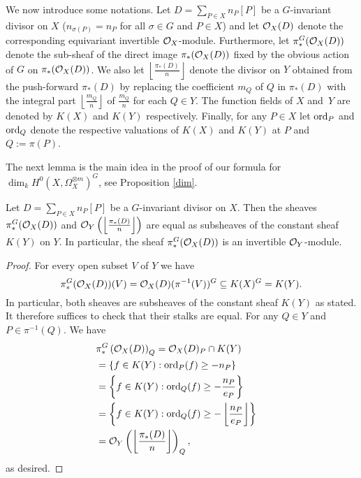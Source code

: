 We now introduce some notations. 
Let $D=\sum_{P\in X}n_P[P]$ be a $G$-invariant divisor on $X$ (\ie $n_{\sigma(P)} = n_P$ for all $\sigma \in G$ and $P\in X$) and let ${\cal O}_X(D)$ denote the corresponding equivariant invertible ${\cal O}_X$-module. 
Furthermore, let $\pi_*^G({\cal O}_X(D))$ denote the sub-sheaf of the direct image $\pi_*({\cal O}_X(D))$ fixed by the obvious action of $G$ on $\pi_*({\cal O}_X(D))$.
We also let $\left\lfloor \frac{\pi_*(D)}{n} \right \rfloor$ denote the divisor on $Y$ obtained from the push-forward $\pi_*(D)$ by replacing the coefficient $m_Q$ of $Q$ in $\pi_*(D)$ with the integral part $\left \lfloor \frac{m_Q}{n} \right \rfloor$ of $\frac{m_Q}{n}$ for each $Q \in Y$. 
The function fields of $X$ and~$Y$ are denoted by $K(X)$ and $K(Y)$ respectively. 
Finally, for any $P \in X$ let $\operatorname{ord}_P$ and $\operatorname{ord}_Q$ denote the respective valuations of $K(X)$ and $K(Y)$ at $P$ and $Q:=\pi(P)$.



The next lemma is the main idea in the proof of our formula for $\dim_kH^0(X,\Omega_X^{\otimes m})^G$, see Proposition \ref{dim}. 



    \begin{lem}
    Let $D=\sum_{P\in X}n_P[P]$ be a $G$-invariant divisor on $X$.
    Then the sheaves $\pi_*^G({\cal O}_X(D))$ and ${\cal O}_Y\left(\left\lfloor \frac{\pi_*(D)}{n}\right \rfloor\right)$ are equal as subsheaves of the constant sheaf $K(Y)$ on $Y$. 
    In particular, the sheaf $\pi_*^G({\cal O}_X(D))$ is an invertible ${\cal O}_Y$-module.
    \end{lem}
    \begin{proof}
    For every open subset $V$ of $Y$ we have 
        \[
        \pi_*^G({\cal O}_X(D))(V) = {\cal O}_X(D) (\pi^{-1}(V))^G \subseteq K(X)^G = K(Y).
        \]
    In particular, both sheaves are subsheaves of the constant sheaf $K(Y)$ as stated. 
    It therefore suffices to check that their stalks are equal. 
    For any $Q \in Y$ and $P \in \pi^{-1}(Q)$.
    We have
        \begin{align*}
        \lefteqn{\pi_*^G\left(\cO_X(D)\right)_Q = \cO_X(D)_P \cap K(Y)}\\
        &= \left\{f \in K(Y): \ord_P(f) \ge -n_P\right\}\\
        &= \left\{f \in K(Y): \ord_Q(f) \ge - \frac{n_P}{e_P}\right\}\\
        &= \left\{ f \in K(Y): \ord_Q(f) \ge - \left\lfloor\frac{n_P}{e_P} \right\rfloor \right\}\\
        &= \cO_Y\left(\left\lfloor \frac{\pi_*(D)}{n} \right\rfloor\right)_Q,
        \end{align*}
    as desired.
    \end{proof}

